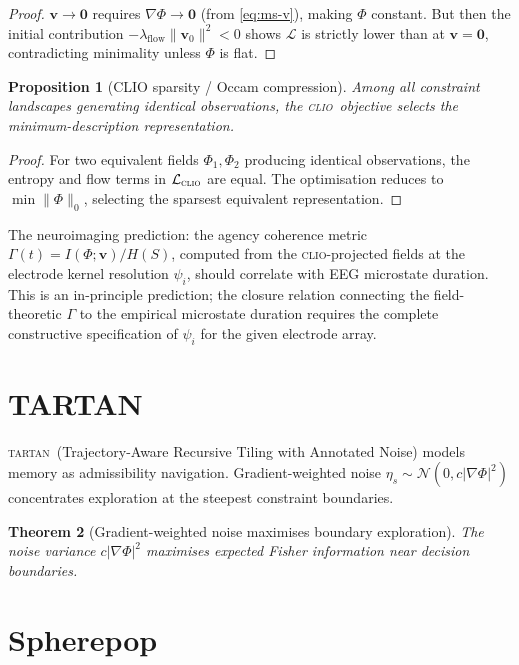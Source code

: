 \documentclass[12pt, oneside]{book}
\theoremstyle{plain}
\newtheorem{theorem}{Theorem}[chapter]
\newtheorem{proposition}[theorem]{Proposition}
\theoremstyle{definition}
\newcommand{\vfield}{\mathbf{v}}
\newcommand{\CLIO}{\textsc{clio}}
\newcommand{\TARTAN}{\textsc{tartan}}
\newcommand{\nab}{\nabla}
\begin{document}
\begin{proof}
$\vfield\to\mathbf{0}$ requires $\nab\Phi\to\mathbf{0}$ (from \eqref{eq:ms-v}),
making $\Phi$ constant. But then the initial contribution
$-\lambda_{\mathrm{flow}}\|\vfield_0\|^2 < 0$ shows $\mathcal{L}$ is strictly
lower than at $\vfield=\mathbf{0}$, contradicting minimality unless $\Phi$ is flat.
\end{proof}

\begin{proposition}[CLIO sparsity / Occam compression]
Among all constraint landscapes generating identical observations, the \CLIO\
objective selects the minimum-description representation.
\end{proposition}

\begin{proof}
For two equivalent fields $\Phi_1, \Phi_2$ producing identical observations, the
entropy and flow terms in $\mathcal{L}_{\CLIO}$ are equal. The optimisation reduces
to $\min\|\Phi\|_0$, selecting the sparsest equivalent representation.
\end{proof}

The neuroimaging prediction: the agency coherence metric $\Gamma(t) =
I(\Phi;\vfield)/H(S)$, computed from the \CLIO-projected fields at the electrode
kernel resolution $\psi_i$, should correlate with EEG microstate duration. This is
an in-principle prediction; the closure relation connecting the field-theoretic
$\Gamma$ to the empirical microstate duration requires the complete constructive
specification of $\psi_i$ for the given electrode array.

\section{TARTAN}
\label{sec:tartan}

\TARTAN\ (Trajectory-Aware Recursive Tiling with Annotated Noise) models memory as
admissibility navigation. Gradient-weighted noise $\eta_s\sim\mathcal{N}(0,c|\nab\Phi|^2)$
concentrates exploration at the steepest constraint boundaries.

\begin{theorem}[Gradient-weighted noise maximises boundary exploration]
The noise variance $c|\nab\Phi|^2$ maximises expected Fisher information near
decision boundaries.
\end{theorem}

\section{Spherepop}
\label{sec:spherepop}
\end{document}
